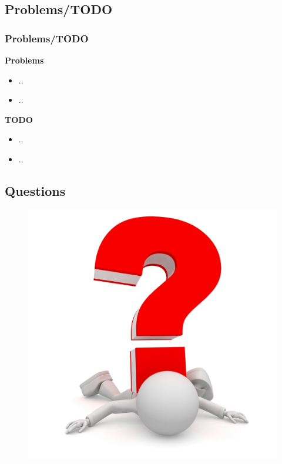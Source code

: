 \documentclass{beamer}
\begin{document}
\subsection{Problems/TODO}
\begin{frame}\frametitle{Problems/TODO}
\textbf{Problems}
\begin{itemize}
	\item ..
	\item ..
\end{itemize}
\textbf{TODO}
\begin{itemize}
	\item ..
	\item ..
\end{itemize}
\end{frame}

\subsection{Questions}
\begin{frame}
	\begin{figure}
		\includegraphics[scale=0.5]{./images/question.jpg}
	\end{figure}
\end{frame}
\end{document}
